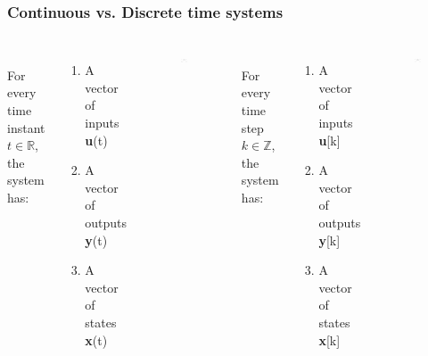 \documentclass{beamer}
\begin{document}
\begin{frame}
\frametitle{Continuous vs. Discrete time systems}
\vspace{-2ex}
\begin{columns}[c] 

\\
For every time instant $t \in \mathds{R}$, the system has: 
\begin{enumerate}
\item A vector of inputs \textbf{u}(t)
\item A vector of outputs \textbf{y}(t)
\item A vector of states \textbf{x}(t)
\end{enumerate}
\begin{figure}
\includegraphics[width=0.8\linewidth]{continuous}
\end{figure}

\\
For every time step $k \in \mathds{Z}$, the system has: 
\begin{enumerate}
\item A vector of inputs \textbf{u}[k]
\item A vector of outputs \textbf{y}[k]
\item A vector of states \textbf{x}[k]
\end{enumerate}
\begin{figure}
\includegraphics[width=0.8\linewidth]{discrete}
\end{figure}

\end{columns}
\end{frame}
\end{document}
